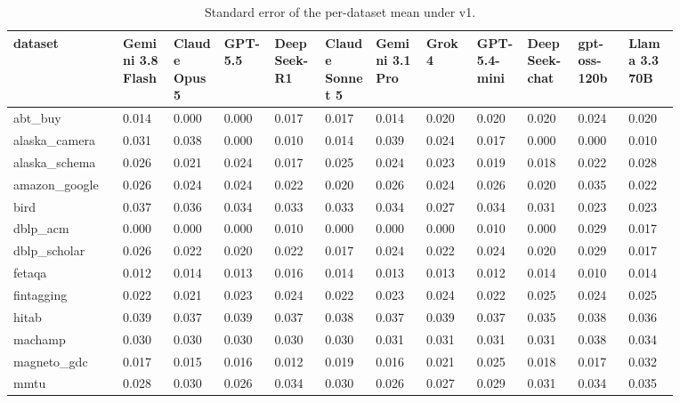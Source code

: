 \begin{landscape}
\tiny
\setlength{\tabcolsep}{3pt}
\begin{longtable}{p{0.134\linewidth}p{0.067\linewidth}p{0.067\linewidth}p{0.067\linewidth}p{0.067\linewidth}p{0.067\linewidth}p{0.067\linewidth}p{0.067\linewidth}p{0.067\linewidth}p{0.067\linewidth}p{0.067\linewidth}p{0.067\linewidth}}
\caption{Standard error of the per-dataset mean under v1.}\label{tab:per_dataset_se_v1}\\
\toprule
dataset & Gemini 3.8 Flash & Claude Opus 5 & GPT-5.5 & DeepSeek-R1 & Claude Sonnet 5 & Gemini 3.1 Pro & Grok 4 & GPT-5.4-mini & DeepSeek-chat & gpt-oss-120b & Llama 3.3 70B \\
\midrule
abt\_\allowbreak{}buy & 0.014 & 0.000 & 0.000 & 0.017 & 0.017 & 0.014 & 0.020 & 0.020 & 0.020 & 0.024 & 0.020 \\
alaska\_\allowbreak{}camera & 0.031 & 0.038 & 0.000 & 0.010 & 0.014 & 0.039 & 0.024 & 0.017 & 0.000 & 0.000 & 0.010 \\
alaska\_\allowbreak{}schema & 0.026 & 0.021 & 0.024 & 0.017 & 0.025 & 0.024 & 0.023 & 0.019 & 0.018 & 0.022 & 0.028 \\
amazon\_\allowbreak{}google & 0.026 & 0.024 & 0.024 & 0.022 & 0.020 & 0.026 & 0.024 & 0.026 & 0.020 & 0.035 & 0.022 \\
bird & 0.037 & 0.036 & 0.034 & 0.033 & 0.033 & 0.034 & 0.027 & 0.034 & 0.031 & 0.023 & 0.023 \\
dblp\_\allowbreak{}acm & 0.000 & 0.000 & 0.000 & 0.010 & 0.000 & 0.000 & 0.000 & 0.010 & 0.000 & 0.029 & 0.017 \\
dblp\_\allowbreak{}scholar & 0.026 & 0.022 & 0.020 & 0.022 & 0.017 & 0.024 & 0.022 & 0.024 & 0.020 & 0.029 & 0.017 \\
fetaqa & 0.012 & 0.014 & 0.013 & 0.016 & 0.014 & 0.013 & 0.013 & 0.012 & 0.014 & 0.010 & 0.014 \\
fintagging & 0.022 & 0.021 & 0.023 & 0.024 & 0.022 & 0.023 & 0.024 & 0.022 & 0.025 & 0.024 & 0.025 \\
hitab & 0.039 & 0.037 & 0.039 & 0.037 & 0.038 & 0.037 & 0.039 & 0.037 & 0.035 & 0.038 & 0.036 \\
machamp & 0.030 & 0.030 & 0.030 & 0.030 & 0.030 & 0.031 & 0.031 & 0.031 & 0.031 & 0.038 & 0.034 \\
magneto\_\allowbreak{}gdc & 0.017 & 0.015 & 0.016 & 0.012 & 0.019 & 0.016 & 0.021 & 0.025 & 0.018 & 0.017 & 0.032 \\
mmtu & 0.028 & 0.030 & 0.026 & 0.034 & 0.030 & 0.026 & 0.027 & 0.029 & 0.031 & 0.034 & 0.035 \\

\end{longtable}
\end{landscape}
